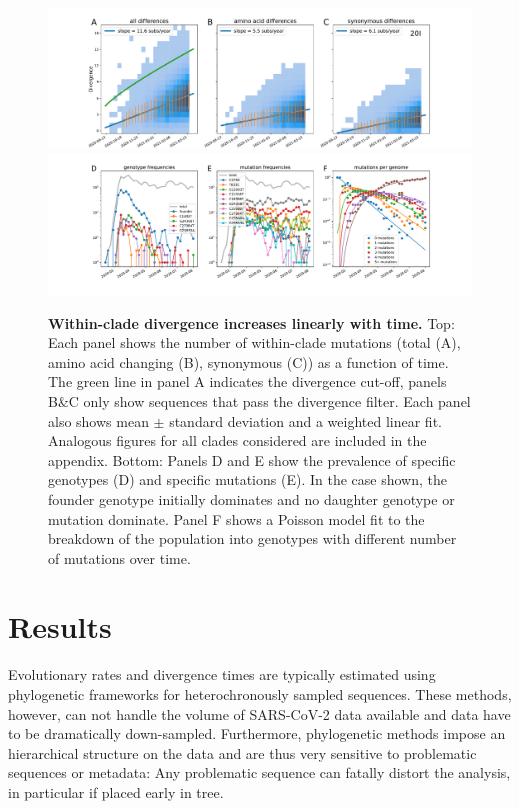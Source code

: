 \documentclass[aps,rmp, twocolumn]{revtex4}
\begin{document}
\begin{figure}[tb]
    \includegraphics[width=\textwidth]{figures/rtt/20I_rtt.pdf}
    \includegraphics[width=\textwidth]{figures/counts/20C_counts.pdf}
    \caption{{\bf Within-clade divergence increases linearly with time.} Top: Each panel shows the number of within-clade mutations (total (A), amino acid changing (B), synonymous (C)) as a function of time.
    The green line in panel A indicates the divergence cut-off, panels B\&C only show sequences that pass the divergence filter. Each panel also shows mean $\pm$ standard deviation and a weighted linear fit. Analogous figures for all clades considered are included in the appendix.
    Bottom: Panels D and E show the prevalence of specific genotypes (D) and specific mutations (E). In the case shown, the founder genotype initially dominates and no daughter genotype or mutation dominate. Panel F shows a Poisson model fit to the breakdown of the population into genotypes with different number of mutations over time.
    \label{fig:within_clade}}
\end{figure}

\section*{Results}

Evolutionary rates and divergence times are typically estimated using phylogenetic frameworks for heterochronously sampled sequences.
These methods, however, can not handle the volume of SARS-CoV-2 data available and data have to be dramatically down-sampled.
Furthermore, phylogenetic methods impose an hierarchical structure on the data and are thus very sensitive to problematic sequences or metadata: Any problematic sequence can fatally distort the analysis, in particular if placed early in tree.
\end{document}
